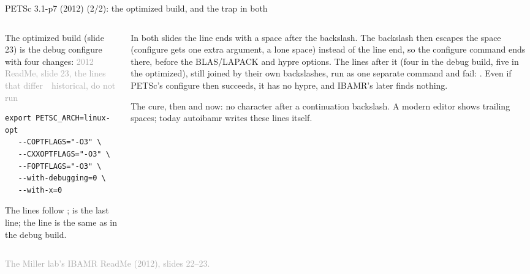 \documentclass[aspectratio=169,11pt]{beamer}
\newcommand{\sourcecredit}[1]{\vfill\begin{flushright}\tiny\textcolor{DarkGray}{#1}\end{flushright}}
\newcommand{\hist}[1]{{\tiny\sffamily\textcolor{DarkGray}{#1\ \textbullet\ historical, do not run}}\par\nointerlineskip\vspace{0.3mm}}
\begin{document}
\begin{frame}[fragile]{PETSc 3.1-p7 (2012) (2/2): the optimized build, and the trap in both}
\label{fr:petsc31b}
\begin{columns}[T,onlytextwidth]
\begin{column}{0.5\textwidth}
\footnotesize The optimized build (slide 23) is the debug configure with four changes:
\hist{2012 ReadMe, slide 23, the lines that differ}
\begin{lstlisting}[style=hist]
 export PETSC_ARCH=linux-opt
   --COPTFLAGS="-O3" \
   --CXXOPTFLAGS="-O3" \
   --FOPTFLAGS="-O3" \
   --with-debugging=0 \
   --with-x=0
\end{lstlisting}
\footnotesize The  lines follow ;  is the last line; the  line is the same as in the debug build.
\end{column}
\begin{column}{0.47\textwidth}
\begin{homebox}
\scriptsize \al{The trap.} In both slides the line \code{--with-c++-support \textbackslash} ends with a space after the backslash. The backslash then escapes the space (configure gets one extra argument, a lone space) instead of the line end, so the configure command ends there, before the BLAS/LAPACK and hypre options. The lines after it (four in the debug build, five in the optimized), still joined by their own backslashes, run as one separate command and fail: . Even if PETSc's configure then succeeds, it has no hypre, and IBAMR's  later finds nothing.
\end{homebox}
\vspace{1mm}
\scriptsize The cure, then and now: no character after a continuation backslash. A modern editor shows trailing spaces; today autoibamr writes these lines itself.
\end{column}
\end{columns}
\sourcecredit{The Miller lab's IBAMR ReadMe (2012), slides 22--23.}
\end{frame}
\end{document}
